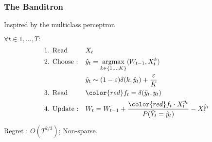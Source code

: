 \documentclass{beamer}
\begin{document}
\begin{frame}
	\frametitle{The Banditron \cite{kakade2008efficient}}
	\begin{small}
	Inspired by the multiclass perceptron \cite{rosenblatt1958perceptron,duda1973pattern}
	\begin{block}{}
		$\forall t \in 1,...,T :$
		\begin{align*}
		&\text{1. Read } 
		&& X_t 
		\\
		&\text{2. Choose :} 
		&& \hat{y}_t = \underset{k \in\{1,..,K\}}{\text{argmax}}  \langle W_{t-1}, X_t^k \rangle 
		\\
		& %
		&& \tilde{y}_t \sim (1-\varepsilon) \delta(k,\hat{y}_t) + \frac{\varepsilon}{K} 
		\\	
		&\text{3. Read } 
		&& {\color{red} f_t = \delta(\tilde{y}_t ,y_t)}  
		\\
		&\text{4. Update :} 
		&& W_t = W_{t-1} + \frac{{\color{red}f_t}\cdot X_t^{\tilde{y}_t}}{P(\tilde{Y}_t=\tilde{y}_t)} - X_t^{\hat{y}_t} 
		\end{align*}
	\end{block}
		Regret : $O(T^{2/3})$; Non-sparse.
	\end{small}

\end{frame}

\end{document}
